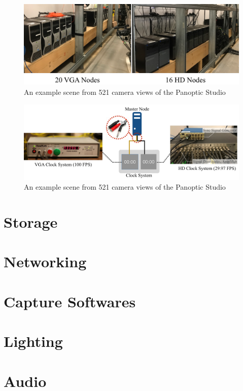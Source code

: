 \begin{figure}[t]
	\centering       
	\includegraphics[trim=0 0 0 0,clip,width=\linewidth]{fig_system/machines}
	\caption{An example scene from 521 camera views of the Panoptic Studio}
	\label{fig:panopticviews}
\end{figure}


\begin{figure}[t]
	\centering       
	\includegraphics[trim=0 0 0 0,clip,width=\linewidth]{fig_system/dome_syncSystem}
	\caption{An example scene from 521 camera views of the Panoptic Studio}
	\label{fig:panopticviews}
\end{figure}


\section{Storage}


\section{Networking}

\section{Capture Softwares}

\section{Lighting}


\section{Audio}



